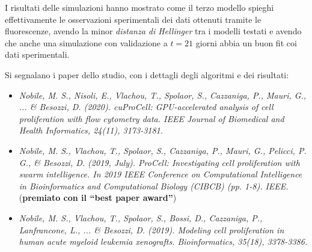\documentclass[a4paper,12pt, oneside]{book}
\begin{document}
I risultati delle simulazioni hanno mostrato come il terzo modello spieghi
effettivamente le osservazioni sperimentali dei dati ottenuti tramite le
fluorescenze, avendo la minor \textit{distanza di Hellinger} tra i modelli
testati e avendo che anche una simulazione con validazione a $t=21$ giorni abbia
un buon fit coi dati sperimentali.
\begin{shaded}
  \noindent
  Si segnalano i paper dello studio, con i dettagli degli algoritmi e dei
  risultati: 
  \begin{itemize}
    \item \textit{Nobile, M. S., Nisoli, E., Vlachou, T., Spolaor, S.,
      Cazzaniga, 
      P., Mauri, G., ... \& Besozzi, D. (2020). cuProCell: GPU-accelerated
      analysis 
      of cell proliferation with flow cytometry data. IEEE Journal of Biomedical
      and Health Informatics, 24(11), 3173-3181.} 
    \item \textit{Nobile, M. S., Vlachou, T., Spolaor, S., Cazzaniga, P., Mauri,
      G., Pelicci, P. G., \& Besozzi, D. (2019, July). ProCell: Investigating
      cell 
      proliferation with swarm intelligence. In 2019 IEEE Conference on
      Computational Intelligence in Bioinformatics and Computational Biology
      (CIBCB) (pp. 1-8). IEEE.} (\textbf{premiato con il ``best paper award''})
    \item \textit{Nobile, M. S., Vlachou, T., Spolaor, S., Bossi, D., Cazzaniga,
      P., Lanfrancone, L., ... \& Besozzi, D. (2019). Modeling cell
      proliferation 
      in human acute myeloid leukemia xenografts. Bioinformatics, 35(18),
      3378-3386. }
  \end{itemize}
\end{shaded}
\end{document}
